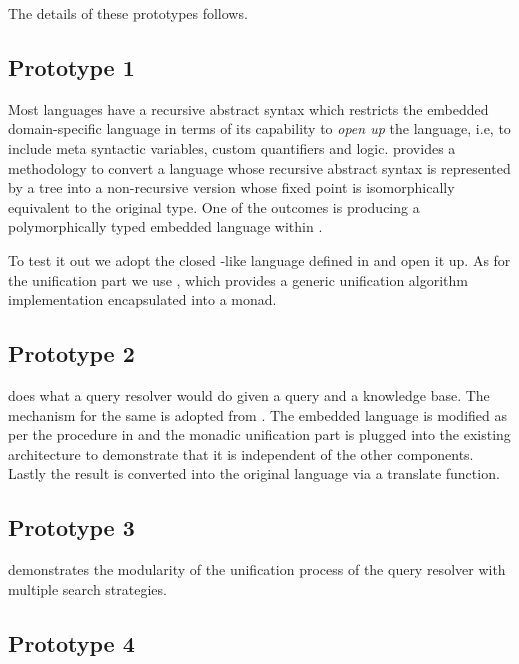 \documentclass[thesis-solanki.tex]{subfiles}
\begin{document}
The details of these prototypes follows.

\subsection{Prototype 1}

Most languages have a recursive abstract syntax which restricts the embedded domain-specific language
 in terms of its capability to \textit{open up} the language, i.e, to
include meta syntactic variables, custom quantifiers and logic.
 provides a methodology to convert a language whose recursive abstract
syntax is represented by a tree into a non-recursive version whose fixed point is isomorphically equivalent to the
original type.
One of the outcomes is producing a polymorphically typed embedded language within .

To test it out we adopt the closed -like language defined in \cite{prolog-lib} and open it up.
As for the unification part we use \cite{unification-fd-lib}, which provides a generic unification algorithm
implementation encapsulated into a monad.


\subsection{Prototype 2}

 does what a  query resolver would do given a query
and a knowledge base.
The mechanism for the same is adopted from \cite{prolog-lib}.
The embedded language is modified as per the procedure in  and the monadic
unification part is plugged into the existing architecture to demonstrate that it is independent of the other
components.
Lastly the result is converted into the original language via a translate function.

\subsection{Prototype 3}

 demonstrates the modularity of the unification process of the query
resolver with multiple search strategies.

\subsection{Prototype 4}
\end{document}
